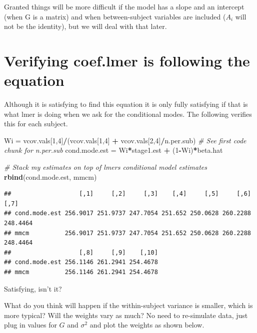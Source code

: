 \documentclass[
]{book}
\newenvironment{Shaded}{\begin{snugshade}}{\end{snugshade}}
\newcommand{\CommentTok}[1]{\textcolor[rgb]{0.56,0.35,0.01}{\textit{#1}}}
\newcommand{\DecValTok}[1]{\textcolor[rgb]{0.00,0.00,0.81}{#1}}
\newcommand{\KeywordTok}[1]{\textcolor[rgb]{0.13,0.29,0.53}{\textbf{#1}}}
\newcommand{\NormalTok}[1]{#1}
\newcommand{\OperatorTok}[1]{\textcolor[rgb]{0.81,0.36,0.00}{\textbf{#1}}}
\newcommand{\StringTok}[1]{\textcolor[rgb]{0.31,0.60,0.02}{#1}}
\begin{document}
Granted things will be more difficult if the model has a slope and an intercept (when G is a matrix) and when between-subject variables are included (\(A_i\) will not be the identity), but we will deal with that later.

\hypertarget{verifying-coef.lmer-is-following-the-equation}{%
\section{Verifying coef.lmer is following the equation}\label{verifying-coef.lmer-is-following-the-equation}}

Although it is satisfying to find this equation it is only fully satisfying if that is what lmer is doing when we ask for the conditional modes. The following verifies this for each subject.

\begin{Shaded}
\begin{Highlighting}[]
\NormalTok{Wi =}\StringTok{ }\NormalTok{vcov.vals[}\DecValTok{1}\NormalTok{,}\DecValTok{4}\NormalTok{]}\OperatorTok{/}\NormalTok{(vcov.vals[}\DecValTok{1}\NormalTok{,}\DecValTok{4}\NormalTok{] }\OperatorTok{+}\StringTok{ }\NormalTok{vcov.vals[}\DecValTok{2}\NormalTok{,}\DecValTok{4}\NormalTok{]}\OperatorTok{/}\NormalTok{n.per.sub) }
\CommentTok{\# See first code chunk for n.per.sub}
\NormalTok{cond.mode.est =}\StringTok{ }\NormalTok{Wi}\OperatorTok{*}\NormalTok{stage1.est }\OperatorTok{+}\StringTok{ }\NormalTok{(}\DecValTok{1}\OperatorTok{{-}}\NormalTok{Wi)}\OperatorTok{*}\NormalTok{beta.hat}

\CommentTok{\# Stack my estimates on top of lmer\textquotesingle{}s conditional model estimates}
\KeywordTok{rbind}\NormalTok{(cond.mode.est, mmcm)                     }
\end{Highlighting}
\end{Shaded}

\begin{verbatim}
##                   [,1]     [,2]     [,3]    [,4]     [,5]     [,6]     [,7]
## cond.mode.est 256.9017 251.9737 247.7054 251.652 250.0628 260.2288 248.4464
## mmcm          256.9017 251.9737 247.7054 251.652 250.0628 260.2288 248.4464
##                   [,8]     [,9]    [,10]
## cond.mode.est 256.1146 261.2941 254.4678
## mmcm          256.1146 261.2941 254.4678
\end{verbatim}

Satisfying, isn't it?

What do you think will happen if the within-subject variance is smaller, which is more typical? Will the weights vary as much? No need to re-simulate data, just plug in values for \(G\) and \(\sigma^2\) and plot the weights as shown below.
\end{document}
